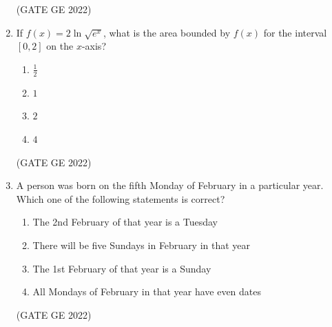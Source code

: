 \documentclass[journal,12pt,onecolumn]{IEEEtran}
\theoremstyle{remark}
\begin{document}
\begin{enumerate}
\hfill (GATE GE 2022)

\item If $f(x) = 2 \ln \sqrt{e^x}$, what is the area bounded by $f(x)$ for the interval $[0, 2]$ on the $x$-axis?
\begin{enumerate}
    \item $\frac{1}{2}$
    \item $1$
    \item $2$
    \item $4$
\end{enumerate}

\hfill (GATE GE 2022)

\item A person was born on the fifth Monday of February in a particular year. Which one of the following statements is correct?
\begin{enumerate}
    \item The 2nd February of that year is a Tuesday
    \item There will be five Sundays in February in that year
    \item The 1st February of that year is a Sunday
    \item All Mondays of February in that year have even dates
\end{enumerate}

\hfill (GATE GE 2022)


\end{enumerate}
\end{document}
